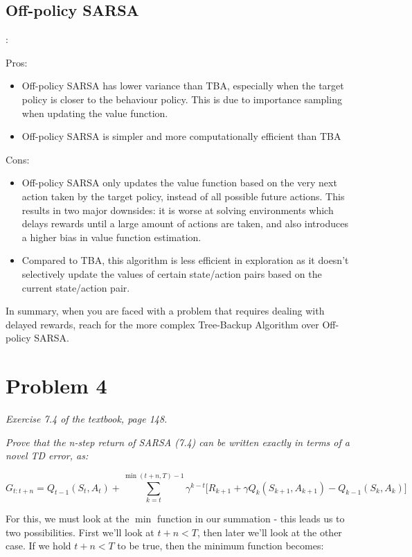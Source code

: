 \documentclass{article}
\begin{document}
\subsection*{Off-policy SARSA}:

Pros:
\begin{itemize}
    \item Off-policy SARSA has lower variance than TBA, especially when the target policy is closer to the behaviour policy. This is due to importance sampling when updating the value function.
    \item Off-policy SARSA is simpler and more computationally efficient than TBA
\end{itemize}

Cons:
\begin{itemize}
    \item Off-policy SARSA only updates the value function based on the very next action taken by the target policy, instead of all possible future actions. This results in two major downsides: it is worse at solving environments which delays rewards until a large amount of actions are taken, and also introduces a higher bias in value function estimation.
    \item Compared to TBA, this algorithm is less efficient in exploration as it doesn't selectively update the values of certain state/action pairs based on the current state/action pair.
\end{itemize}

In summary, when you are faced with a problem that requires dealing with delayed rewards, reach for the more complex Tree-Backup Algorithm over Off-policy SARSA.

\section*{Problem 4}
\textit{Exercise 7.4 of the textbook, page 148.}

\textit{Prove that the n-step return of SARSA (7.4) can be written exactly in terms of a novel TD error, as:}

\begin{equation}
    G_{t:t+n} = Q_{t-1}(S_t, A_t) + \sum^{\min(t+n,T)-1}_{k=t} \gamma^{k-t} \biggr[ R_{k+1} + \gamma Q_k(S_{k+1}, A_{k+1}) - Q_{k-1}(S_k, A_k) \biggl]
\end{equation}

For this, we must look at the $\min$ function in our summation - this leads us to two possibilities. First we'll look at $t+n < T$, then later we'll look at the other case. If we hold $t+n<T$ to be true, then the minimum function becomes:
\end{document}
